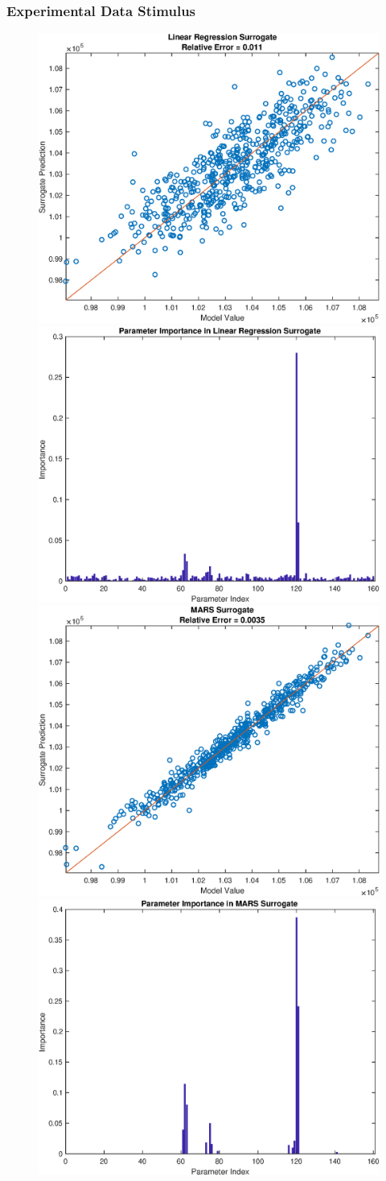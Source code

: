 \documentclass[12pt]{article}
\numberwithin{equation}{section}
\begin{document}
\newpage

\subsubsection{Experimental Data Stimulus}

\begin{figure}[h]
\centering
\includegraphics[width=.49 \textwidth]{Figures/K_AC_Mean_QoI_LR_Prediction_Experimental.eps}
\includegraphics[width=.49 \textwidth]{Figures/K_AC_Mean_QoI_LR_VI_Experimental.eps}\\
\includegraphics[width=.49 \textwidth]{Figures/K_AC_Mean_QoI_MARS_Prediction_Experimental.eps}
\includegraphics[width=.49 \textwidth]{Figures/K_AC_Mean_QoI_MARS_VI_Experimental.eps}
\end{figure}
\end{document}
